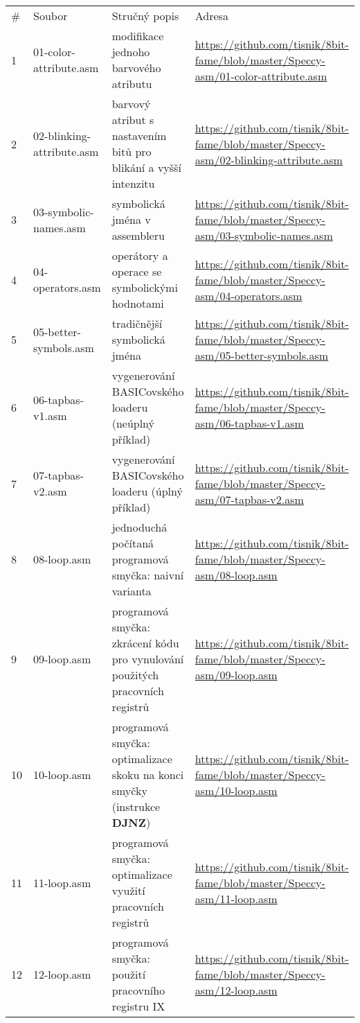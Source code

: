 \documentclass{article}
\begin{document}
\begin{longtable}[]{@{}llll@{}}
\toprule
\endhead
\# & Soubor & Stručný popis & Adresa \\
1 & 01-color-attribute.asm & modifikace jednoho barvového atributu &
\url{https://github.com/tisnik/8bit-fame/blob/master/Speccy-asm/01-color-attribute.asm} \\
2 & 02-blinking-attribute.asm & barvový atribut s nastavením bitů pro
blikání a vyšší intenzitu &
\url{https://github.com/tisnik/8bit-fame/blob/master/Speccy-asm/02-blinking-attribute.asm} \\
3 & 03-symbolic-names.asm & symbolická jména v assembleru &
\url{https://github.com/tisnik/8bit-fame/blob/master/Speccy-asm/03-symbolic-names.asm} \\
4 & 04-operators.asm & operátory a operace se symbolickými hodnotami &
\url{https://github.com/tisnik/8bit-fame/blob/master/Speccy-asm/04-operators.asm} \\
5 & 05-better-symbols.asm & tradičnější symbolická jména &
\url{https://github.com/tisnik/8bit-fame/blob/master/Speccy-asm/05-better-symbols.asm} \\
6 & 06-tapbas-v1.asm & vygenerování BASICovského loaderu (neúplný
příklad) &
\url{https://github.com/tisnik/8bit-fame/blob/master/Speccy-asm/06-tapbas-v1.asm} \\
7 & 07-tapbas-v2.asm & vygenerování BASICovského loaderu (úplný příklad)
&
\url{https://github.com/tisnik/8bit-fame/blob/master/Speccy-asm/07-tapbas-v2.asm} \\
8 & 08-loop.asm & jednoduchá počítaná programová smyčka: naivní varianta
&
\url{https://github.com/tisnik/8bit-fame/blob/master/Speccy-asm/08-loop.asm} \\
9 & 09-loop.asm & programová smyčka: zkrácení kódu pro vynulování
použitých pracovních registrů &
\url{https://github.com/tisnik/8bit-fame/blob/master/Speccy-asm/09-loop.asm} \\
10 & 10-loop.asm & programová smyčka: optimalizace skoku na konci smyčky
(instrukce \textbf{DJNZ}) &
\url{https://github.com/tisnik/8bit-fame/blob/master/Speccy-asm/10-loop.asm} \\
11 & 11-loop.asm & programová smyčka: optimalizace využití pracovních
registrů &
\url{https://github.com/tisnik/8bit-fame/blob/master/Speccy-asm/11-loop.asm} \\
12 & 12-loop.asm & programová smyčka: použití pracovního registru IX &
\url{https://github.com/tisnik/8bit-fame/blob/master/Speccy-asm/12-loop.asm} \\

\end{longtable}
\end{document}
